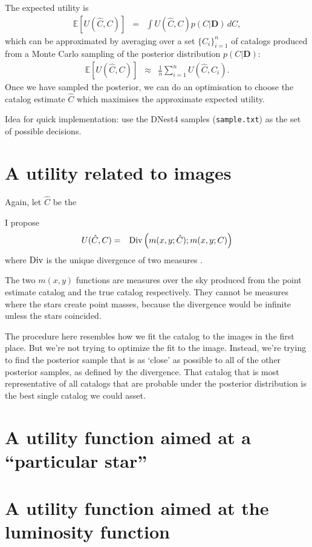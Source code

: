 \documentclass[a4paper,fleqn,usenatbib]{mnras}
\newcommand{\data}{\boldsymbol{D}}
\begin{document}
The expected utility is
\begin{eqnarray}
\mathds{E}\left[U(\hat{C}, C)\right]
&=&
\int U(\hat{C}, C) p(C | \data) \, dC,
\end{eqnarray}
which can be approximated by averaging over a set $\{C_i\}_{i=1}^n$
of catalogs produced from a Monte Carlo sampling of the posterior distribution
$p(C|\data)$:
\begin{eqnarray}
\mathds{E}\left[U(\hat{C}, C)\right]
&\approx&
\frac{1}{n} \sum_{i=1}^n U(\hat{C}, C_i).
\end{eqnarray}
Once we have sampled the posterior, we can do an optimisation to choose the
catalog estimate $\hat{C}$ which maximises the approximate expected utility.

Idea for quick implementation: use the DNest4 samples ({\tt sample.txt})
as the set of possible decisions.

\section{A utility related to images}
Again, let $\hat{C}$ be the 

I propose
\begin{eqnarray}
U(\hat{C}, C) &=& \textnormal{Div}\left(m(x, y; \hat{C}); m(x, y; C)\right)
\end{eqnarray}
where $\textnormal{Div}$ is the unique divergence of
two measures \citep{knuth2012foundations}.

The two $m(x, y)$ functions are measures over the sky produced from the
point estimate catalog and the true catalog respectively. They cannot be
measures where the stars create point masses, because the divergence would
be infinite unless the stars coincided.

The procedure here resembles how we fit the catalog to the images in the
first place. But we're not trying to optimize the fit to the image. Instead,
we're trying to find the posterior sample that is as `close' as possible to
all of the other posterior samples, as defined by the divergence. That catalog
that is most representative of all catalogs that are probable under the
posterior distribution is the best single catalog we could asset.

\section{A utility function aimed at a ``particular star''}


\section{A utility function aimed at the luminosity function}
\end{document}
